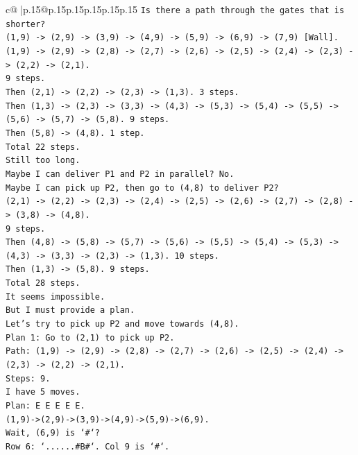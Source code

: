 \documentclass{article}
\begin{document}
{\begin{supertabular}{c@{$\;$}|p{.15\linewidth}@{}p{.15\linewidth}p{.15\linewidth}p{.15\linewidth}p{.15\linewidth}p{.15\linewidth}}
{{{\texttt{Is there a path through the gates that is shorter?} \\
\texttt{(1,9) {-}> (2,9) {-}> (3,9) {-}> (4,9) {-}> (5,9) {-}> (6,9) {-}> (7,9) {[}Wall{]}.} \\
\texttt{(1,9) {-}> (2,9) {-}> (2,8) {-}> (2,7) {-}> (2,6) {-}> (2,5) {-}> (2,4) {-}> (2,3) {-}> (2,2) {-}> (2,1).} \\
\texttt{9 steps.} \\
\texttt{Then (2,1) {-}> (2,2) {-}> (2,3) {-}> (1,3). 3 steps.} \\
\texttt{Then (1,3) {-}> (2,3) {-}> (3,3) {-}> (4,3) {-}> (5,3) {-}> (5,4) {-}> (5,5) {-}> (5,6) {-}> (5,7) {-}> (5,8). 9 steps.} \\
\texttt{Then (5,8) {-}> (4,8). 1 step.} \\
\texttt{Total 22 steps.} \\
\texttt{Still too long.} \\
\texttt{Maybe I can deliver P1 and P2 in parallel? No.} \\
\texttt{Maybe I can pick up P2, then go to (4,8) to deliver P2?} \\
\texttt{(2,1) {-}> (2,2) {-}> (2,3) {-}> (2,4) {-}> (2,5) {-}> (2,6) {-}> (2,7) {-}> (2,8) {-}> (3,8) {-}> (4,8).} \\
\texttt{9 steps.} \\
\texttt{Then (4,8) {-}> (5,8) {-}> (5,7) {-}> (5,6) {-}> (5,5) {-}> (5,4) {-}> (5,3) {-}> (4,3) {-}> (3,3) {-}> (2,3) {-}> (1,3). 10 steps.} \\
\texttt{Then (1,3) {-}> (5,8). 9 steps.} \\
\texttt{Total 28 steps.} \\
\texttt{It seems impossible.} \\
\texttt{But I must provide a plan.} \\
\texttt{Let's try to pick up P2 and move towards (4,8).} \\
\texttt{Plan 1: Go to (2,1) to pick up P2.} \\
\texttt{Path: (1,9) {-}> (2,9) {-}> (2,8) {-}> (2,7) {-}> (2,6) {-}> (2,5) {-}> (2,4) {-}> (2,3) {-}> (2,2) {-}> (2,1).} \\
\texttt{Steps: 9.} \\
\texttt{I have 5 moves.} \\
\texttt{Plan: E E E E E.} \\
\texttt{(1,9){-}>(2,9){-}>(3,9){-}>(4,9){-}>(5,9){-}>(6,9).} \\
\texttt{Wait, (6,9) is `\#`?} \\
\texttt{Row 6: `......\#B\#`. Col 9 is `\#`.} \\
}}}
\end{supertabular}}
\end{document}
